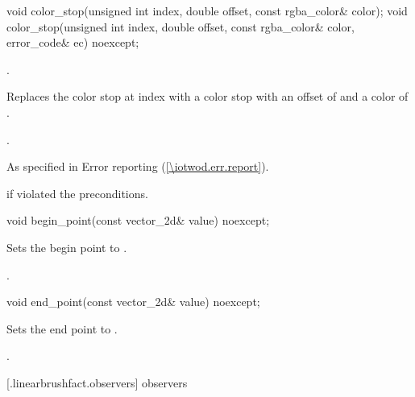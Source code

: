 \begin{itemdecl}
    void color_stop(unsigned int index, double offset,
      const rgba_color& color);
    void color_stop(unsigned int index, double offset,
      const rgba_color& color, error_code& ec) noexcept;
\end{itemdecl}
\begin{itemdescr}
	\pnum
	\requires
	.
	
	\pnum
	\effects
	Replaces the color stop at index  with a color stop with an offset of  and a color of .

	\pnum
	\postconditions
	.
	
	\pnum
	\throws
	As specified in Error reporting (\ref{\iotwod.err.report}).
	
	\pnum
	\errors
	 if  violated the preconditions.
\end{itemdescr}

\begin{itemdecl}
    void begin_point(const vector_2d& value) noexcept;
\end{itemdecl}
\begin{itemdescr}
	\pnum
	\effects
	Sets the begin point to .

	\pnum
	\postconditions
	.
	
\end{itemdescr}

\begin{itemdecl}
    void end_point(const vector_2d& value) noexcept;
\end{itemdecl}
\begin{itemdescr}
	\pnum
	\effects
	Sets the end point to .
	
	\pnum
	\postconditions
	.
	
\end{itemdescr}

 [\iotwod.linearbrushfact.observers] { observers}

